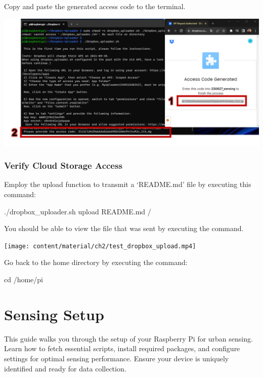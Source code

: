 \documentclass[
  letterpaper,
]{scrbook}
\newenvironment{Shaded}{\begin{snugshade}}{\end{snugshade}}
\newcommand{\BuiltInTok}[1]{\textcolor[rgb]{0.00,0.23,0.31}{#1}}
\newcommand{\ExtensionTok}[1]{\textcolor[rgb]{0.00,0.23,0.31}{#1}}
\newcommand{\NormalTok}[1]{\textcolor[rgb]{0.00,0.23,0.31}{#1}}
\begin{document}
Copy and paste the generated access code to the terminal.

\includegraphics{content/material/ch2/dropbox_register3.png}

\subsection{Verify Cloud Storage
Access}\label{verify-cloud-storage-access}

Employ the upload function to transmit a `README.md' file by executing
this command:

\begin{Shaded}
\begin{Highlighting}[]
\ExtensionTok{./dropbox\_uploader.sh}\NormalTok{ upload README.md /}
\end{Highlighting}
\end{Shaded}

You should be able to view the file that was sent by executing the
command.

\texttt{[image: content/material/ch2/test\_dropbox\_upload.mp4]}

Go back to the home directory by executing the command:

\begin{Shaded}
\begin{Highlighting}[]
\BuiltInTok{cd}\NormalTok{ /home/pi}
\end{Highlighting}
\end{Shaded}

\chapter{Sensing Setup}\label{sensing-setup}

This guide walks you through the setup of your Raspberry Pi for urban
sensing. Learn how to fetch essential scripts, install required
packages, and configure settings for optimal sensing performance. Ensure
your device is uniquely identified and ready for data collection.
\end{document}
